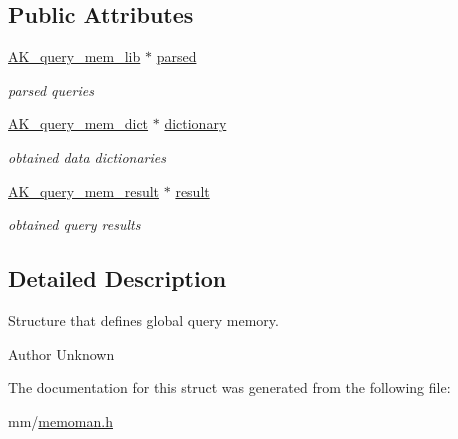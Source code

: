 \subsection*{Public Attributes}
\begin{DoxyCompactItemize}
\item 
\mbox{\label{structAK__query__mem_a3b5ffb6f531f7f0a6821f3d643bd55db}} 
\hyperlink{structAK__query__mem__lib}{A\+K\+\_\+query\+\_\+mem\+\_\+lib} $\ast$ \hyperlink{structAK__query__mem_a3b5ffb6f531f7f0a6821f3d643bd55db}{parsed}
\begin{DoxyCompactList}\small\item\em parsed queries \end{DoxyCompactList}\item 
\mbox{\label{structAK__query__mem_ac75fcb9c9e74444239b7fa9862ce3ffe}} 
\hyperlink{structAK__query__mem__dict}{A\+K\+\_\+query\+\_\+mem\+\_\+dict} $\ast$ \hyperlink{structAK__query__mem_ac75fcb9c9e74444239b7fa9862ce3ffe}{dictionary}
\begin{DoxyCompactList}\small\item\em obtained data dictionaries \end{DoxyCompactList}\item 
\mbox{\label{structAK__query__mem_ac9e0f1fb8381c15b83051bb9f520d703}} 
\hyperlink{structAK__query__mem__result}{A\+K\+\_\+query\+\_\+mem\+\_\+result} $\ast$ \hyperlink{structAK__query__mem_ac9e0f1fb8381c15b83051bb9f520d703}{result}
\begin{DoxyCompactList}\small\item\em obtained query results \end{DoxyCompactList}\end{DoxyCompactItemize}


\subsection{Detailed Description}
Structure that defines global query memory. 

\begin{DoxyAuthor}{Author}
Unknown 
\end{DoxyAuthor}


The documentation for this struct was generated from the following file\+:\begin{DoxyCompactItemize}
\item 
mm/\hyperlink{memoman_8h}{memoman.\+h}\end{DoxyCompactItemize}
